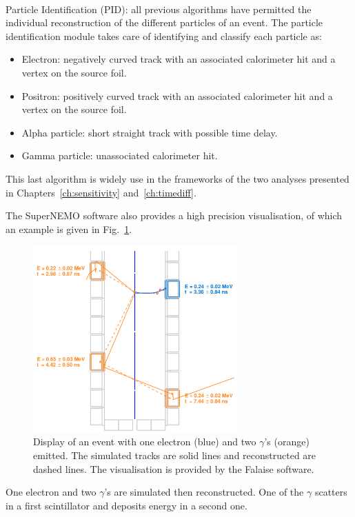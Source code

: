 \paragraph{} Particle Identification (PID): all previous algorithms have permitted the individual reconstruction of the different particles of an event.
The particle identification module takes care of identifying and classify each particle as:
\begin{itemize}
\item Electron: negatively curved track with an associated calorimeter hit and a vertex on the source foil.
\item Positron: positively curved track with an associated calorimeter hit and a vertex on the source foil.
\item Alpha particle: short straight track with possible time delay.
\item Gamma particle: unassociated calorimeter hit.
\end{itemize}
This last algorithm is widely use in the frameworks of the two analyses presented in Chapters~\ref{ch:sensitivity} and~\ref{ch:timediff}.

The SuperNEMO software also provides a high precision visualisation, of which an example is given in Fig.~\ref{fig:visu}.
\begin{figure}[h!]
\centering
\includegraphics[width=0.7\textwidth]{SNdemonstrator/fig_SNdemonstrator/Falaise_visu.pdf}
\caption{Display of an event with one electron (blue) and two $\gamma$'s (orange) emitted.
  The simulated tracks are solid lines and reconstructed are dashed lines.
  The visualisation is provided by the Falaise software.
\label{fig:visu}}
\end{figure}
One electron and two $\gamma$'s are simulated then reconstructed.
One of the $\gamma$ scatters in a first scintillator and deposits energy in a second one.


